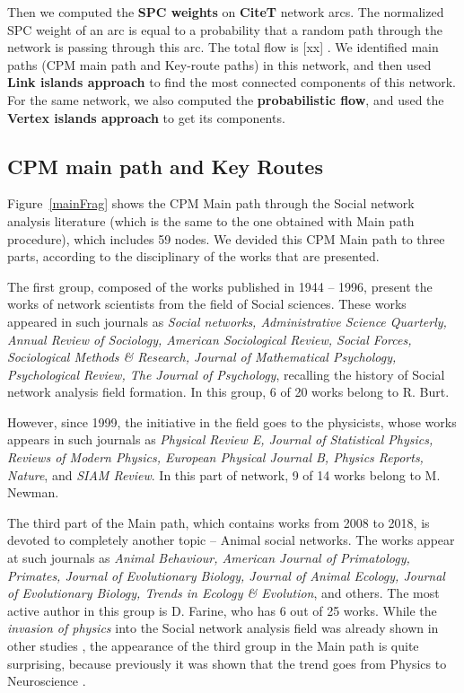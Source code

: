 \documentclass[11pt]{article} %
\newcommand{\Remark}[1]{\ifodd\value{page} \normalmarginpar
 \else \reversemarginpar \fi \marginpar{{\footnotesize #1}} }
\begin{document}
Then we computed the \textbf{SPC weights} on \textbf{CiteT} network arcs. The normalized SPC weight of an arc is equal to a probability that a random path through the network is passing through this arc. The total flow is [xx]\Remark{write total flow}. We identified main paths (CPM main path and Key-route paths) in this network, and then used \textbf{Link islands approach} \citep{Understand} to find the most connected components of this network. For the same network, we also computed the \textbf{probabilistic flow}, and used the \textbf{Vertex islands approach} to get its components. \medskip

\subsection{CPM main path and Key Routes}  

Figure~\ref{mainFrag} shows the CPM Main path through the Social network analysis literature (which is the same to the one obtained with Main path procedure), which includes 59 nodes. We devided this CPM Main path to three parts, according to the disciplinary of the works that are presented. \medskip 

The first group, composed of the works published in 1944 -- 1996, present the works of network scientists from the field of Social sciences. These works appeared in such journals as \textit{Social networks, Administrative Science Quarterly, Annual Review of Sociology, American Sociological Review, Social Forces, Sociological Methods \& Research, Journal of Mathematical Psychology, Psychological Review, The Journal of Psychology}, recalling the history of Social network analysis field formation. In this group, 6 of 20 works belong to R. Burt. \medskip 

However, since 1999, the initiative in the field goes to the physicists, whose works appears in such journals  as \textit{Physical Review E, Journal of Statistical Physics, Reviews of Modern Physics, European Physical Journal B, Physics Reports, Nature}, and \textit{SIAM Review}. In this part of network, 9 of 14 works belong to M. Newman. \medskip 

The third part of the Main path, which contains works from 2008 to 2018, is devoted to completely another topic -- Animal social networks. The works appear at such journals as \textit{Animal Behaviour, American Journal of Primatology, Primates, Journal of Evolutionary Biology, Journal of Animal Ecology, Journal of Evolutionary Biology, Trends in Ecology \& Evolution}, and others. The most active author in this group is D. Farine, who has 6 out of 25 works. While the \textit{invasion of physics} into the Social network analysis field was already shown in other studies \citep{lazer,brandes}, the appearance of the third group in the Main path is quite surprising, because previously it was shown that the trend goes from Physics to Neuroscience \citep{Understand}. \medskip  
\end{document}
